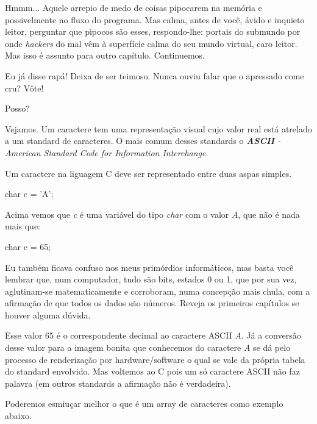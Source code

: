 
Hmmm... Aquele arrepio de medo de coisas pipocarem na memória e possivelmente no fluxo do programa. Mas calma, antes de você, ávido e inquieto leitor, perguntar que pipocos são esses, respondo-lhe: portais do submundo por onde \textit{hackers} do mal vêm à superfície calma do seu mundo virtual, caro leitor. Mas isso é assunto para outro capítulo. Continuemos.


Eu já disse rapá! Deixa de ser teimoso. Nunca ouviu falar que o apressado come cru? Vôte!

Posso?


Vejamos. Um caractere tem uma representação visual cujo valor real está atrelado a um standard de caracteres. O mais comum desses standards o \textit{\textbf{ASCII} - American Standard Code for Information Interchange}.

Um caractere na liguagem C deve ser representado entre duas aspas simples.

\begin{ccode}
  char c = 'A';
\end{ccode}

Acima vemos que \textit{c} é uma variável do tipo \textit{char} com o valor \textit{A}, que não é nada mais que:

\begin{ccode}
  char c = 65;
\end{ccode}


Eu também ficava confuso nos meus primórdios informáticos, mas basta você lembrar que, num computador, tudo são bits, estados 0 ou 1, que por sua vez, aglutinam-se matematicamente e corroboram, numa concepção mais chula, com a afirmação de que todos os dados são números. Reveja os primeiros capítulos se houver alguma dúvida.


Esse valor 65 é o correspondente decimal ao caractere ASCII \textit{A}. Já a conversão desse valor para a imagem bonita que conhecemos do caractere \textit{A} se dá pelo processo de renderização por hardware/software o qual se vale da própria tabela do standard envolvido. Mas voltemos ao C pois um só caractere ASCII não faz palavra (em outros standards a afirmação não é verdadeira).

Poderemos esmiuçar melhor o que é um array de caracteres como exemplo abaixo.

